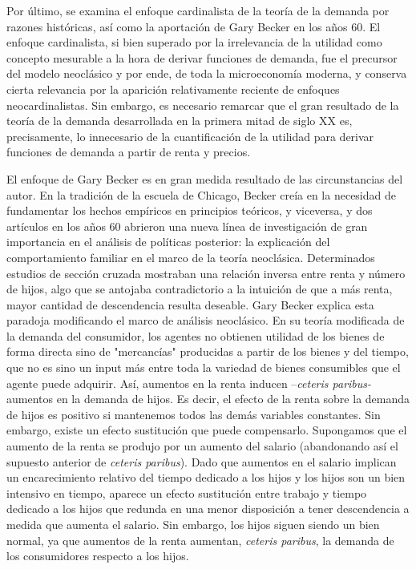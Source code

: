 \documentclass{nuevotema}
\begin{document}
Por último, se examina el enfoque cardinalista de la teoría de la demanda por razones históricas, así como la aportación de Gary Becker en los años 60. El enfoque cardinalista, si bien superado por la irrelevancia de la utilidad como concepto mesurable a la hora de derivar funciones de demanda, fue el precursor del modelo neoclásico y por ende, de toda la microeconomía moderna, y conserva cierta relevancia por la aparición relativamente reciente de enfoques neocardinalistas. Sin embargo, es necesario remarcar que el gran resultado de la teoría de la demanda desarrollada en la primera mitad de siglo XX es, precisamente, lo innecesario de la cuantificación de la utilidad para derivar funciones de demanda a partir de renta y precios. 

El enfoque de Gary Becker es en gran medida resultado de las circunstancias del autor. En la tradición de la escuela de Chicago, Becker creía en la necesidad de fundamentar los hechos empíricos en principios teóricos, y viceversa, y dos artículos en los años 60 abrieron una nueva línea de investigación de gran importancia en el análisis de políticas posterior: la explicación del comportamiento familiar en el marco de la teoría neoclásica. Determinados estudios de sección cruzada mostraban una relación inversa entre renta y número de hijos, algo que se antojaba contradictorio a la intuición de que a más renta, mayor cantidad de descendencia resulta deseable. Gary Becker explica esta paradoja  modificando el marco de análisis neoclásico. En su teoría modificada de la demanda del consumidor, los agentes no obtienen utilidad de los bienes de forma directa sino de "mercancías" producidas a partir de los bienes y del tiempo, que no es sino un input más entre toda la variedad de bienes consumibles que el agente puede adquirir. Así, aumentos en la renta inducen --\textit{ceteris paribus-} aumentos en la demanda de hijos. Es decir, el efecto de la renta sobre la demanda de hijos es positivo si mantenemos todos las demás variables constantes. Sin embargo, existe un efecto sustitución que puede compensarlo. Supongamos que el aumento de la renta se produjo por un aumento del salario (abandonando así el supuesto anterior de \textit{ceteris paribus}). Dado que aumentos en el salario implican un encarecimiento relativo del tiempo dedicado a los hijos y los hijos son un bien intensivo en tiempo, aparece un efecto sustitución entre trabajo y tiempo dedicado a los hijos que redunda en una menor disposición a tener descendencia a medida que aumenta el salario. Sin embargo, los hijos siguen siendo un bien normal, ya que aumentos  de la renta aumentan, \textit{ceteris paribus}, la demanda de los consumidores respecto a los hijos.
\end{document}
